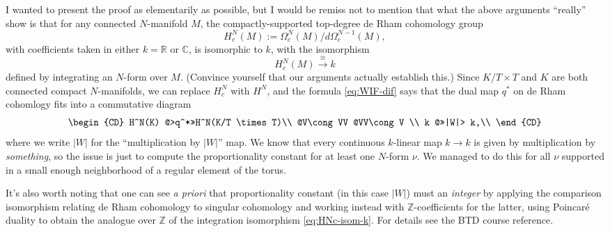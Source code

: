 \documentclass[reqno]{amsart} 
\begin{document}
\begin{remark}
  I wanted to present the proof as elementarily as possible, but I would be remiss not to mention that what the above arguments ``really'' show is that for any connected $N$-manifold $M$, the compactly-supported top-degree de Rham cohomology group
  \begin{equation*}
    H^N_c(M) := \Omega_c^N(M) / d \Omega_c^{N-1}(M),
  \end{equation*}
  with coefficients taken in either $k = \mathbb{R}$ or $\mathbb{C}$, is isomorphic to $k$, with the isomorphism
  \begin{equation}\label{eq:HNc-isom-k}
    H^N_c(M) \xrightarrow{\cong} k
  \end{equation}
  defined by integrating an $N$-form over $M$.  (Convince yourself that our arguments actually establish this.)  Since $K/T \times T$ and $K$ are both connected compact $N$-manifolds, we can replace $H^N_c$ with $H^N$, and the formula \eqref{eq:WIF-dif} says that the dual map $q^*$ on de Rham cohomlogy fits into a commutative diagram
  \begin{equation*}
    \begin{CD}         
      H^N(K)   @>q^*>>H^N(K/T \times T)\\
      @V\cong VV  @VV\cong V \\
      k @>>|W|> k,\\
    \end{CD}
  \end{equation*}
  where we write $|W|$ for the ``multiplication by $|W|$'' map.  We know that every continuous $k$-linear map $k \rightarrow k$ is given by multiplication by \emph{something}, so the issue is just to compute the proportionality constant for at least one $N$-form $\nu$.  We managed to do this for all $\nu$ supported in a small enough neighborhood of a regular element of the torus.

  It's also worth noting that one can see \emph{a priori} that proportionality constant (in this case $|W|$) must an \emph{integer} by applying the comparison isomorphism relating de Rham cohomology to singular cohomology and working instead with $\mathbb{Z}$-coefficients for the latter, using Poincar{\'e} duality to obtain the analogue over $\mathbb{Z}$ of the integration isomorphism \eqref{eq:HNc-isom-k}.  For details see the BTD course reference.
\end{remark}
\end{document}
